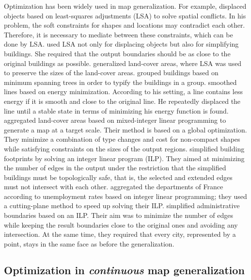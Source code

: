 \documentclass[acmsmall,natbib=false]{acmart}
\begin{document}
Optimization has been widely used in map generalization.
For example, \textcite{Harrie1999} displaced objects 
based on least-squares adjustments (LSA)
to solve spatial conflicts.
In his problem, the soft constraints 
for shapes and locations may contradict each other.
Therefore, it is necessary 
to mediate between these constraints, 
which can be done by LSA.
\textcite{Sester2005Optimization} used LSA not only for 
displacing objects but also for simplifying buildings. 
She required that 
the output boundaries should be 
as close to the original buildings as possible.
\textcite{Tong2015AreaLSA} generalized land-cover areas,
where LSA was used to preserve the sizes of 
the land-cover areas.
\textcite{Regnauld2001} grouped buildings based on 
minimum spanning trees in order to typify
the buildings in a group.
\textcite{Burghardt2005Snakes} smoothed lines based on 
energy minimization. 
According to his setting, a line contains less energy
if it is smooth and close to the original line.
He repeatedly displaced the line 
until a stable state 
in terms of minimizing his energy function is found.
\textcite{HaunertWolff2010AreaAgg} aggregated land-cover areas
based on mixed-integer linear programming
to generate a map at a target scale.
Their method is based on a global optimization.
They minimize a combination of type changes and cost for non-compact shapes 
while satisfying constraints on the sizes of the output regions.
\textcite{Haunertwolff2010Building} simplified building
footprints by solving an integer linear program (ILP).
They aimed at minimizing the number of edges in the output 
under the restriction that 
the simplified buildings must be topologically safe,
that is, the selected and extended edges must not intersect with 
each other.
\textcite{Oehrlein2017Aggregation} aggregated the departments 
of France according to unemployment rates based on integer 
linear programming; they used a cutting-plane method to 
speed up solving their ILP.
\textcite{Funke2017Simplification} simplified 
administrative boundaries based on an ILP.
Their aim was to minimize the number of edges
while keeping the result boundaries close to the original ones
and avoiding any intersection. 
At the same time, they required that every city, 
represented by a point, 
stays in the same face as before the generalization.



\subsection{Optimization in \emph{continuous} map generalization}
\end{document}
